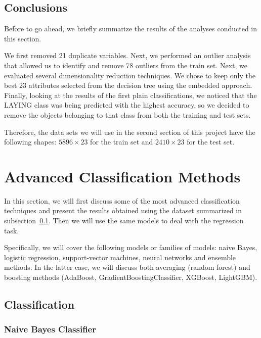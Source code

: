 \documentclass[10pt, a4paper, twocolumn]{article}
\begin{document}
\subsection{Conclusions}\label{subsec:module1_conclusion}

Before to go ahead, we briefly summarize the results of the analyses conducted in this section. 

We first removed 21 duplicate variables. Next, we performed an outlier analysis that allowed us to identify and remove 78 outliers from the train set. Next, we evaluated several dimensionality reduction techniques. We chose to keep only the best 23 attributes selected from the decision tree using the embedded approach. Finally, looking at the results of the first plain classifications, we noticed that the LAYING class was being predicted with the highest accuracy, so we decided to remove the objects belonging to that class from both the training and test sets.

Therefore, the data sets we will use in the second section of this project have the following shapes: $5896 \times 23$ for the train set and $2410 \times 23$ for the test set.

\section{Advanced Classification Methods}

In this section, we will first discuss some of the most advanced classification techniques and present the results obtained using the dataset summarized in subsection~\ref{subsec:module1_conclusion}. Then we will use the same models to deal with the regression task. 

Specifically, we will cover the following models or families of models: naive Bayes, logistic regression, support-vector machines, neural networks and ensemble methods. In the latter case, we will discuss both averaging (random forest) and boosting methods (AdaBoost, GradientBoostingClassifier, XGBoost, LightGBM).

\subsection{Classification}

\subsubsection*{Naive Bayes Classifier}
\end{document}
